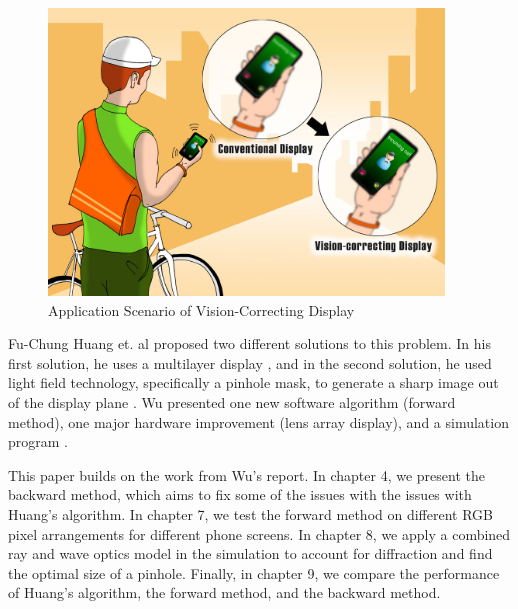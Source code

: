\begin{figure}[ht]
  \centering
  \includegraphics[height=3in]{chapters/chapter1/images/phone.jpg}
  \caption{Application Scenario of Vision-Correcting Display \cite{Huang:2014:VisionCorrectingDisplay}}
  \label{fig:application}
\end{figure}

Fu-Chung Huang et. al proposed two different solutions to this problem. In his first solution, he uses a multilayer display \cite{Huang:2012:COA:2366145.2366204}, and in the second solution, he used light field technology, specifically a pinhole mask, to generate a sharp image out of the display plane \cite{Huang:2014:VisionCorrectingDisplay}. Wu presented one new software algorithm (forward method), one major hardware improvement (lens array display), and a simulation program \cite{Wu:EECS-2016-67}. 

This paper builds on the work from Wu's report. In chapter 4, we present the backward method, which aims to fix some of the issues with the issues with Huang's algorithm. In chapter 7, we test the forward method on different RGB pixel arrangements for different phone screens. In chapter 8, we apply a combined ray and wave optics model in the simulation to account for diffraction and find the optimal size of a pinhole. Finally, in chapter 9, we compare the performance of Huang's algorithm, the forward method, and the backward method.


